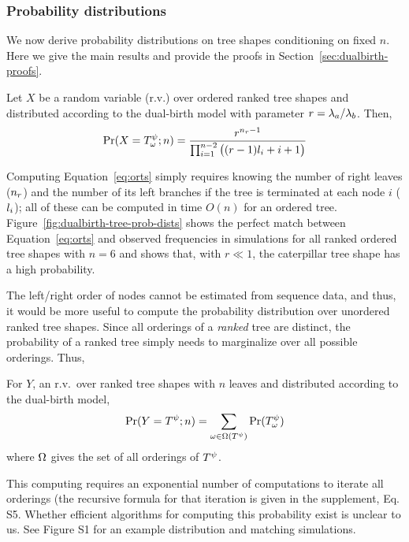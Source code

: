 \subsubsection{Probability distributions}
We now derive probability distributions on tree shapes conditioning on fixed $n$. Here we give the main results and provide the proofs in Section~\ref{sec:dualbirth-proofs}.

\begin{theorem}\label{thm:TRO}
Let $X$ be a random variable (r.v.) over ordered ranked tree shapes and distributed according to the dual-birth model with parameter $r=\lambda_a/\lambda_b$. Then, 
\begin{equation}\label{eq:orts}
\Pr(X=T^\psi_{\omega};n) = \frac{r^{n_r-1}}{\prod_{i=1}^{n-2} \big((r-1)l_{i}+i+1\big)}
\end{equation}
\end{theorem}

Computing Equation~\ref{eq:orts} simply requires knowing the number of right leaves ($n_r$) and the number of its left branches if the tree is terminated at each node $i$ ($l_{i}$); all of these can be computed in time $O(n)$ for an ordered tree. Figure~\ref{fig:dualbirth-tree-prob-dists} shows the perfect match between Equation~\ref{eq:orts} and observed frequencies in simulations for all ranked ordered tree shapes with $n=6$ and shows that, with $r\ll1$, the caterpillar tree shape has a high probability.

The left/right order of nodes cannot be estimated from sequence data, and thus, it would be more useful to compute the probability distribution over unordered ranked tree shapes. Since all orderings of a {\em ranked} tree are distinct, the probability of a ranked tree simply needs to marginalize over all possible orderings. Thus,
\begin{corollary}
For $Y$, an r.v.\ over ranked tree shapes with $n$ leaves and distributed according to the dual-birth model,
\begin{equation}\label{eq:rts}
\Pr(Y=T^\psi;n) = \sum_{\omega\in\Omega(T^\psi)} \Pr(T^\psi_{\omega})
\end{equation}
where $\Omega$ gives the set of all orderings of $T^\psi$.
\end{corollary}

This computing requires
an exponential number of 
computations to iterate all orderings (the recursive formula for that iteration is given
 in the supplement, Eq. S5. %
Whether efficient
algorithms for computing this probability 
exist is unclear to us. 
See Figure S1 %
for an example distribution
and matching simulations.


